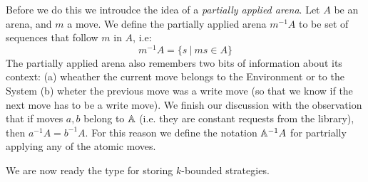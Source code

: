Before we do this we introudce the idea of a \emph{partially applied arena}.
Let $A$ be an arena, and $m$ a move. We define the partially applied arena ${m^{-1}}A$ 
to be set of sequences that follow $m$ in $A$, i.e:
\[m^{-1}A = \{s \ | \ ms \in A \}\]
The partially applied arena also remembers two bits of information about its context: (a) wheather the current move belongs to the Environment or to the System
(b) wheter the previous move was a write move (so that we know if the next move has to be a write move). We finish our discussion with the observation 
that if moves $a, b$ belong to $\mathbb A$ (i.e. they are constant requests from the library), then $a^{-1}A = b^{-1}A$. 
For this reason we define the notation $\mathbb A^{-1}A$ for partrially applying any of the atomic moves. 


We are now ready the type for storing $k$-bounded strategies. 

